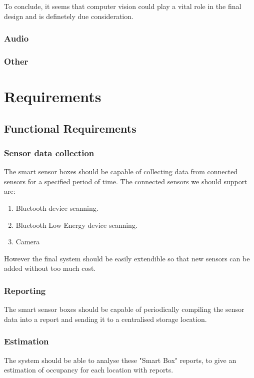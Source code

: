 \documentclass{l4proj}
\begin{document}
To conclude, it seems that computer vision could play a vital role in the final design and is definetely due consideration.

\subsection{Audio}



\subsection{Other}


\chapter{Requirements}

\section{Functional Requirements}

\subsection{Sensor data collection}
The smart sensor boxes should be capable of collecting data from connected sensors for a specified period of time. The connected sensors we should support are:
\begin{enumerate}
  \item Bluetooth device scanning.
  \item Bluetooth Low Energy device scanning.
  \item Camera
\end{enumerate}
However the final system should be easily extendible so that new sensors can be added without too much cost.

\subsection{Reporting}
The smart sensor boxes should be capable of periodically compiling the sensor data into a report and sending it to a centralised storage location.

\subsection{Estimation}
The system should be able to analyse these "Smart Box" reports, to give an estimation of occupancy for each location with reports.
\end{document}
